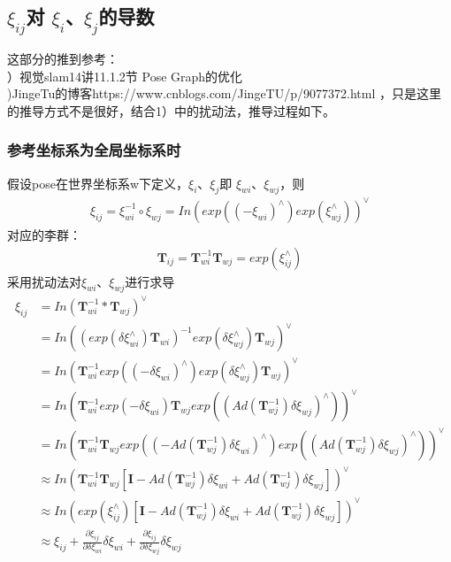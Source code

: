 \subsection{$\xi_{ij}$对 $\xi_i$、$\xi_j$的导数}
这部分的推到参考：\\
）视觉slam14讲11.1.2节 Pose Graph的优化\\
)JingeTu的博客https://www.cnblogs.com/JingeTU/p/9077372.html ，只是这里的推导方式不是很好，结合1）中的扰动法，推导过程如下。


\subsubsection{参考坐标系为全局坐标系时}
假设pose在世界坐标系w下定义，$\xi_i$、$\xi_j$即 $\xi_{wi}$、$\xi_{wj}$，则\\
\begin{align}
	\xi_{ij} = \xi^{-1}_{wi}\circ\xi_{wj}=In(exp((-\xi_{wi})^\wedge) exp( \xi_{wj}^\wedge))^\vee
\end{align}
对应的李群：\\
\begin{align}
\textbf{T}_{ij} = \textbf{T}_{wi}^{-1} \textbf{T}_{wj}= exp(\xi_{ij}^\wedge)
\end{align}
采用扰动法对$\xi_{wi}$、$\xi_{wj}$进行求导
\begin{equation}
\begin{aligned}
\xi_{ij}& = In(\textbf{T}_{wi}^{-1} * \textbf{T}_{wj})^\vee\\
        & =In((exp(\delta\xi_{wi}^\wedge)\textbf{T}_{wi})^{-1}  exp(\delta\xi_{wj}^\wedge)\textbf{T}_{wj})^\vee \\
        & =In(\textbf{T}_{wi}^{-1}exp((-\delta\xi_{wi})^\wedge)  exp(\delta\xi_{wj}^\wedge)\textbf{T}_{wj})^\vee \\
        & =In(\textbf{T}_{wi}^{-1}exp(-\delta\xi_{wi})  \textbf{T}_{wj}exp((Ad(\textbf{T}_{wj}^{-1})\delta\xi_{wj})^\wedge))^\vee \\
        & =In(\textbf{T}_{wi}^{-1} \textbf{T}_{wj} exp((-Ad(\textbf{T}_{wj}^{-1})\delta\xi_{wi})^\wedge)  exp((Ad(\textbf{T}_{wj}^{-1})\delta\xi_{wj})^\wedge))^\vee \\
        &\approx In(\textbf{T}_{wi}^{-1} \textbf{T}_{wj} [\textbf{I}-Ad(\textbf{T}_{wj}^{-1})\delta\xi_{wi} + Ad(\textbf{T}_{wj}^{-1})\delta\xi_{wj} ]) ^\vee\\
        &\approx In( exp(\xi_{ij}^\wedge) [\textbf{I}-Ad(\textbf{T}_{wj}^{-1})\delta\xi_{wi} + Ad(\textbf{T}_{wj}^{-1})\delta\xi_{wj} ]) ^\vee\\
        &\approx \xi_{ij}+\frac{\partial \xi_{ij}}{\partial \delta\xi_{wi}}\delta\xi_{wi}+\frac{\partial \xi_{ij}}{\partial \delta\xi_{wj}}\delta\xi_{wj}
\end{aligned}
\end{equation}
